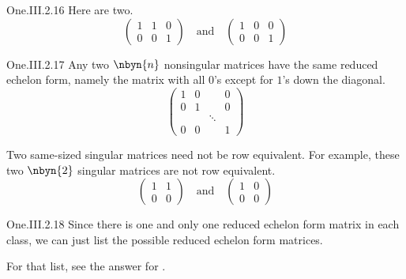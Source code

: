 \begin{ans}{One.III.2.16}
      Here are two.
      \begin{equation*}
        \begin{pmatrix}
          1  &1  &0  \\
          0  &0  &1
        \end{pmatrix}
        \quad\text{and}\quad
        \begin{pmatrix}
          1  &0  &0  \\
          0  &0  &1
        \end{pmatrix}
      \end{equation*}
     
\end{ans}
\begin{ans}{One.III.2.17}
      Any two \( \nbyn{n} \) nonsingular matrices have
      the same reduced echelon
      form, namely the matrix with all \( 0 \)'s except for \( 1 \)'s down
      the diagonal.
      \begin{equation*}
        \begin{pmatrix}
          1  &0  &       &0  \\
          0  &1  &       &0  \\
             &   &\ddots &   \\
          0  &0  &       &1
        \end{pmatrix}
      \end{equation*}

      Two same-sized singular matrices need not be row equivalent.
      For example, these two \( \nbyn{2} \) singular matrices
      are not row equivalent.
      \begin{equation*}
        \begin{pmatrix}
          1  &1  \\
          0  &0
        \end{pmatrix}
        \quad\text{and}\quad
        \begin{pmatrix}
          1  &0  \\
          0  &0
        \end{pmatrix}
      \end{equation*}
    
\end{ans}
\begin{ans}{One.III.2.18}
      Since there is one and only one reduced echelon form matrix in each
      class, we can just list the possible reduced echelon form matrices.

      For that list, see the answer for .
    
\end{ans}
